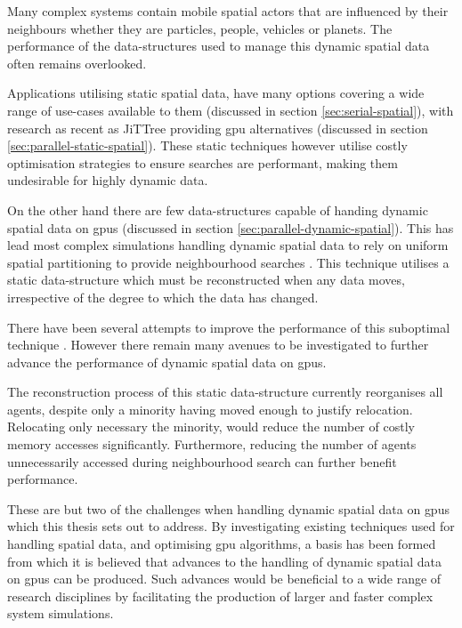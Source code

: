   Many complex systems contain mobile spatial actors that are influenced by their neighbours whether they are particles, people, vehicles or planets. The performance of the data-structures used to manage this dynamic spatial data often remains overlooked.
  
  Applications utilising static spatial data, have many options covering a wide range of use-cases available to them \cite{FB74,Mea80,FKN80,Gut84,SRF87} (discussed in section \ref{sec:serial-spatial}), with research as recent as JiTTree providing \gls{gpu} alternatives \cite{LB*16} (discussed in section \ref{sec:parallel-static-spatial}). These static techniques however utilise costly optimisation strategies to ensure searches are performant, making them undesirable for highly dynamic data. 
  
  On the other hand there are few data-structures capable of handing dynamic spatial data on \glspl{gpu} (discussed in section \ref{sec:parallel-dynamic-spatial}). This has lead most complex simulations handling dynamic spatial data to rely on uniform spatial partitioning to provide neighbourhood searches \cite{GS*10}. This technique utilises a static data-structure which must be reconstructed when any data moves, irrespective of the degree to which the data has changed.
  
  There have been several attempts to improve the performance of this suboptimal technique \cite{GS*10,HY*15,JR*15}. However there remain many avenues to be investigated to further advance the performance of dynamic spatial data on \glspl{gpu}.
  
  The reconstruction process of this static data-structure currently reorganises all agents, despite only a minority having moved enough to justify relocation. Relocating only necessary the minority, would reduce the number of costly memory accesses significantly. Furthermore, reducing the number of agents unnecessarily accessed during neighbourhood search can further benefit performance.
  
  These are but two of the challenges when handling dynamic spatial data on \glspl{gpu} which this thesis sets out to address. By investigating existing techniques used for handling spatial data, and optimising \gls{gpu} algorithms, a basis has been formed from which it is believed that advances to the handling of dynamic spatial data on \glspl{gpu} can be produced. Such advances would be beneficial to a wide range of research disciplines by facilitating the production of larger and faster complex system simulations.
 
